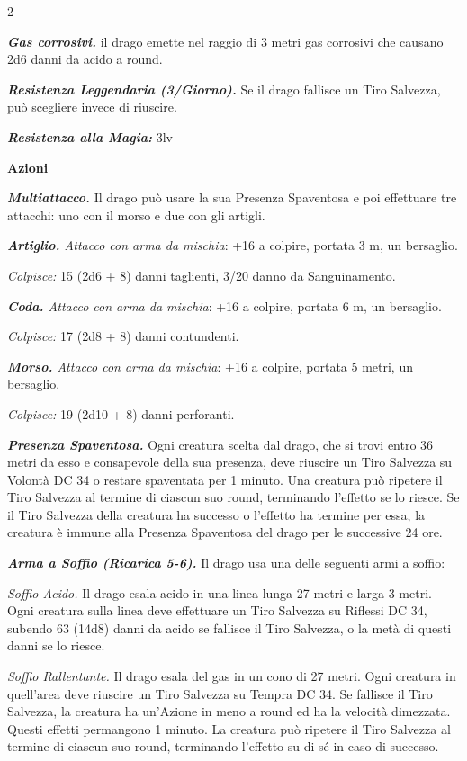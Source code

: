 \begin{multicols}{2}
{\emph{\textbf{Gas corrosivi.}} il drago emette nel raggio di 3 metri gas corrosivi che causano 2d6 danni da acido a round.

\emph{\textbf{Resistenza Leggendaria (3/Giorno).}} Se il drago fallisce un Tiro Salvezza, può scegliere invece di riuscire.

\emph{\textbf{Resistenza alla Magia:}} 3lv

\textbf{Azioni}

\emph{\textbf{Multiattacco.}} Il drago può usare la sua Presenza Spaventosa e poi effettuare tre attacchi: uno con il morso e due con gli artigli.

\emph{\textbf{Artiglio.} Attacco con arma da mischia}: +16 a colpire, portata 3 m, un bersaglio.

\emph{Colpisce:} 15 (2d6 + 8) danni taglienti, 3/20 danno da Sanguinamento.

\emph{\textbf{Coda.} Attacco con arma da mischia}: +16 a colpire, portata 6 m, un bersaglio.

\emph{Colpisce:} 17 (2d8 + 8) danni contundenti.

\emph{\textbf{Morso.} Attacco con arma da mischia}: +16 a colpire, portata 5 metri, un bersaglio.

\emph{Colpisce:} 19 (2d10 + 8) danni perforanti.

\emph{\textbf{Presenza Spaventosa.}} Ogni creatura scelta dal drago, che si trovi entro 36 metri da esso e consapevole della sua presenza, deve riuscire un Tiro Salvezza su Volontà DC 34 o restare spaventata per 1 minuto. Una creatura può ripetere il Tiro Salvezza al termine di ciascun suo round, terminando l'effetto se lo riesce. Se il Tiro Salvezza della creatura ha successo o l'effetto ha termine per essa, la creatura è immune alla Presenza Spaventosa del drago per le successive 24 ore.

\emph{\textbf{Arma a Soffio (Ricarica 5-6).}} Il drago usa una delle seguenti armi a soffio:

\emph{Soffio Acido.} Il drago esala acido in una linea lunga 27 metri e larga 3 metri. Ogni creatura sulla linea deve effettuare un Tiro Salvezza su Riflessi DC 34, subendo 63 (14d8) danni da acido se fallisce il Tiro Salvezza, o la metà di questi danni se lo riesce.

\emph{Soffio Rallentante.} Il drago esala del gas in un cono di 27 metri. Ogni creatura in quell'area deve riuscire un Tiro Salvezza su Tempra DC 34. Se fallisce il Tiro Salvezza, la creatura ha un'Azione in meno a round ed ha la velocità dimezzata. Questi effetti permangono 1 minuto. La creatura può ripetere il Tiro Salvezza al termine di ciascun suo round, terminando l'effetto su di sé in caso di successo.

}
\end{multicols}
